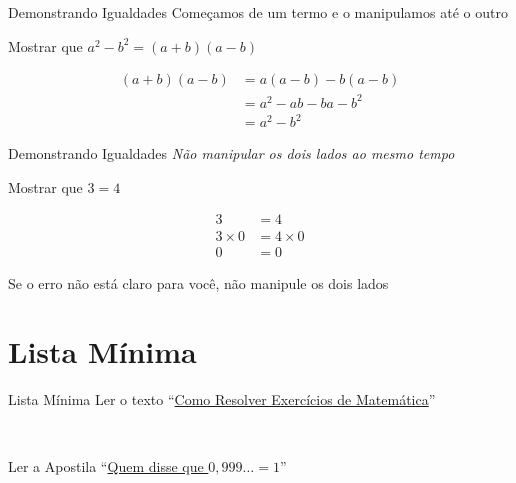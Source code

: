 \begin{frame}{Demonstrando Igualdades}
  Começamos de um termo e o manipulamos até o outro

  \pause
  \vspace{\baselineskip}
  Mostrar que \(a^2-b^2 = (a+b)(a-b)\)

  \pause
  \begin{align*}
    (a+b)(a-b)
    & = a(a-b) - b(a-b) \\
    & = a^2 - ab - ba - b^2 \\
    & = a^2 - b^2
  \end{align*}
\end{frame}

\begin{frame}{Demonstrando Igualdades}
  \emph{Não manipular os dois lados ao mesmo tempo}

  \pause
  \vspace{\baselineskip}
  Mostrar que \(3=4\)

  \pause
  \begin{align*}
    3          & = 4          \\
    3 \times 0 & = 4 \times 0 \\
    0          & = 0
  \end{align*}

  \pause
  Se o erro não está claro para você, não manipule os dois lados
\end{frame}

\section{Lista Mínima}

\begin{frame}{Lista Mínima}
  Ler o texto
  ``\href{https://drive.google.com/file/d/1h39y9FEjm6QrzK2Lqjg15CQ94gvFqjtu/view?usp=sharing}%
  {Como Resolver Exercícios de Matemática}''

  ~

  Ler a Apostila
  ``\href{https://sites.google.com/view/prof-luis-dafonseca/ensino-b\%C3\%A1sico/infinito}%
  {Quem disse que $0,999\dots=1$}''
\end{frame}



